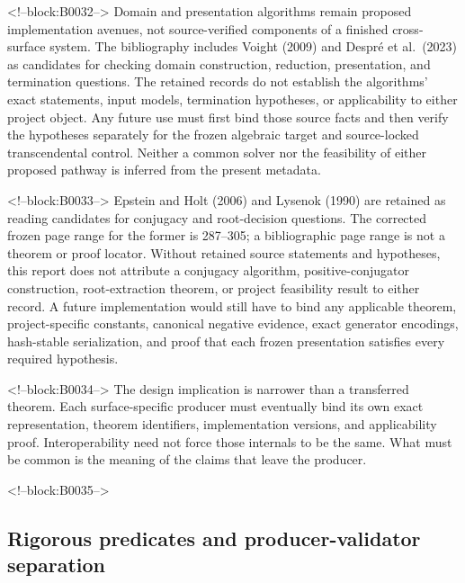 \documentclass[11pt,a4paper]{article}
\begin{document}
<!--block:B0032-->
Domain and presentation algorithms remain proposed implementation avenues, not source-verified components of a finished cross-surface system. The bibliography includes Voight (2009)
\citep{P33-S10}
 and Despré et al.~(2023)
\citep{P33-S11}
 as candidates for checking domain construction, reduction, presentation, and termination questions. The retained records do not establish the algorithms' exact statements, input models, termination hypotheses, or applicability to either project object. Any future use must first bind those source facts and then verify the hypotheses separately for the frozen algebraic target and source-locked transcendental control. Neither a common solver nor the feasibility of either proposed pathway is inferred from the present metadata.

<!--block:B0033-->
Epstein and Holt (2006)
\citep{P33-S12}
 and Lysenok (1990)
\citep{P33-S13}
 are retained as reading candidates for conjugacy and root-decision questions. The corrected frozen page range for the former is 287--305; a bibliographic page range is not a theorem or proof locator. Without retained source statements and hypotheses, this report does not attribute a conjugacy algorithm, positive-conjugator construction, root-extraction theorem, or project feasibility result to either record. A future implementation would still have to bind any applicable theorem, project-specific constants, canonical negative evidence, exact generator encodings, hash-stable serialization, and proof that each frozen presentation satisfies every required hypothesis.

<!--block:B0034-->
The design implication is narrower than a transferred theorem. Each surface-specific producer must eventually bind its own exact representation, theorem identifiers, implementation versions, and applicability proof. Interoperability need not force those internals to be the same. What must be common is the meaning of the claims that leave the producer.

<!--block:B0035-->
\hypertarget{rigorous-predicates-and-producer-validator-separation}{%
\subsection{Rigorous predicates and producer-validator separation}\label{rigorous-predicates-and-producer-validator-separation}}
\end{document}
